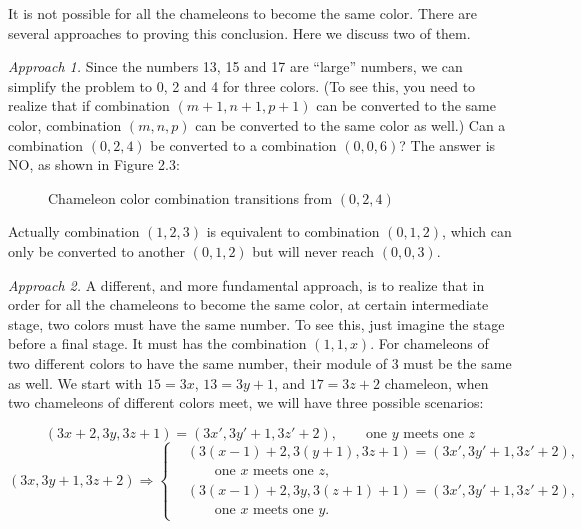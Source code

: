 \begin{solution}
It is not possible for all the chameleons to become the same color. There
are several approaches to proving this conclusion. Here we discuss two of them.

\emph{Approach 1.} Since the numbers 13, 15 and 17 are ``large'' numbers, we can simplify
the problem to 0, 2 and 4 for three colors. (To see this, you need to realize that if
combination $(m+1,n+1,p+1)$ can be converted to the same color, combination $(m,n,p)$
can be converted to the same color as well.) Can a combination $(0,2,4)$ be converted to a
combination $(0,0,6)$? The answer is NO, as shown in Figure 2.3:

\begin{figure}[ht]
\centering
{}
\caption{Chameleon color combination transitions from $(0,2,4)$}
\label{fig:zhou-figure-2-3}
\end{figure}

Actually combination $(1,2,3)$ is equivalent to combination $(0,1,2)$, which can only be
converted to another $(0,1,2)$ but will never reach $(0,0,3)$.

\emph{Approach 2.} A different, and more fundamental approach, is to realize that in order
for all the chameleons to become the same color, at certain intermediate stage, two colors
must have the same number. To see this, just imagine the stage before a final stage. It must
has the combination $(1,1,x)$. For chameleons of two different colors to have the same
number, their module of 3 must be the same as well. We start with $15=3x$, $13=3y+1$,
and $17=3z+2$ chameleon, when two chameleons of different colors meet, we will have
three possible scenarios:

\[
(3x+2,3y,3z+1)=(3x',3y'+1,3z'+2),\qquad \text{one $y$ meets one $z$}
\]
\[
(3x,3y+1,3z+2)\Rightarrow
\left\{
\begin{aligned}
&(3(x-1)+2,3(y+1),3z+1)=(3x',3y'+1,3z'+2),\\
&\qquad\text{one $x$ meets one $z$},\\
&(3(x-1)+2,3y,3(z+1)+1)=(3x',3y'+1,3z'+2),\\
&\qquad\text{one $x$ meets one $y$}.
\end{aligned}
\right.
\]


\end{solution}
